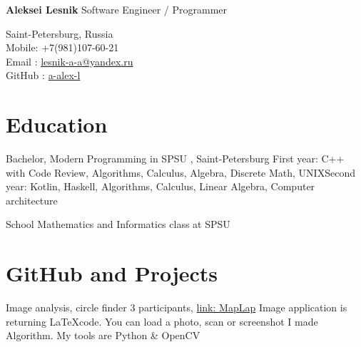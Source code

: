 \documentclass[12pt,a4paper]{moderncv}
\begin{document}

	\begin{minipage} {0.7\textwidth}
		\begin{flushleft}
			\huge \textbf{Aleksei Lesnik} 
			\newline
			\textcolor[gray]{0.4} {
			    \indent Software Engineer / Programmer\\
			}
			\normalsize
		\end{flushleft}
	\end{minipage}
	\begin{minipage} {0.3\textwidth}
		\begin{flushright}
			\textcolor[gray]{0.4} {
				\indent Saint-Petersburg, Russia\\
				\indent Mobile: +7(981)107-60-21  \\
				\indent Email : \textcolor{blue} {\href{mailto:lesnik-a-a@yandex.ru} {lesnik-a-a@yandex.ru}}\\ 
				\indent GitHub : \textcolor{blue} {\href{https://github.com/a-alex-l} {a-alex-l}}\\  	
			}
		\end{flushright}
	\end{minipage}

    \section{Education}
    
         {Bachelor, Modern Programming in SPSU} {}{} {\textcolor{blue} {}, Saint-Petersburg} {First year: C++ with Code Review, Algorithms, Calculus, Algebra, Discrete Math, UNIX\newline  Second year: Kotlin, Haskell, Algorithms, Calculus, Linear Algebra, Computer architecture}
    
         {School} {}{} {Mathematics and Informatics class at SPSU} {}
        
    \section{GitHub and Projects}
        
         {Image analysis, circle finder} {3 participants, \textcolor{blue} {\href{https://github.com/a-alex-l/MapLap} {link: MapLap}}} {} {\newline Image application is returning \LaTeX code. You can load a photo, scan or screenshot} {I made Algorithm. My tools are \textcolor{Attention} {Python \& OpenCV} }
        
\end{document}
